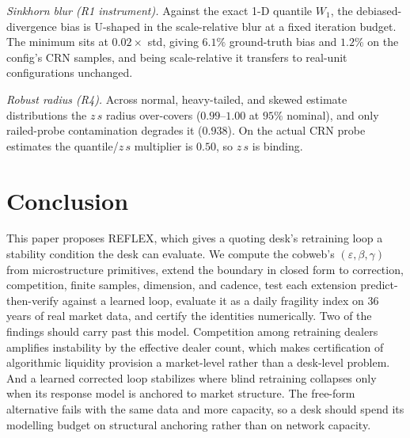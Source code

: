 \documentclass[sigconf,anonymous,review]{acmart}
\newcommand{\eps}{\varepsilon}
\newcommand{\Wone}{W_1}
\begin{document}
\emph{Sinkhorn blur (R1 instrument).} Against the exact 1-D quantile $\Wone$,
the debiased-divergence bias is U-shaped in the scale-relative blur at a
fixed iteration budget. The minimum sits at $0.02\times$ std, giving
$6.1\%$ ground-truth bias and $1.2\%$ on the config's CRN samples, and being
scale-relative it transfers to real-unit configurations unchanged.

\emph{Robust radius (R4).} Across normal, heavy-tailed, and skewed estimate
distributions the $z\,s$ radius over-covers ($0.99$--$1.00$ at $95\%$
nominal), and only railed-probe contamination degrades it ($0.938$). On the
actual CRN probe estimates the quantile/$z\,s$ multiplier is $0.50$, so
$z\,s$ is binding.

\section{Conclusion}
This paper proposes REFLEX, which gives a quoting desk's retraining loop a
stability condition the desk can evaluate. We compute the cobweb's
$(\eps,\beta,\gamma)$ from microstructure primitives, extend the boundary in
closed form to correction, competition, finite samples, dimension, and
cadence, test each extension predict-then-verify against a learned loop,
evaluate it as a daily fragility index on 36 years of real market data, and
certify the identities numerically. Two of the findings should carry past this model.
Competition among retraining dealers amplifies instability by the effective
dealer count, which makes certification of algorithmic liquidity provision a
market-level rather than a desk-level problem. And a learned corrected loop
stabilizes where blind retraining collapses only when its response model is
anchored to market structure. The free-form alternative fails with the same
data and more capacity, so a desk should spend its modelling budget on
structural anchoring rather than on network capacity.
\end{document}

